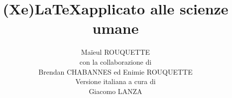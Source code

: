 







\title{(Xe)\LaTeX applicato alle scienze umane}
\author{Maïeul ROUQUETTE \\ con la collaborazione di \\ Brendan CHABANNES ed Enimie ROUQUETTE \\ Versione italiana a cura di \\ Giacomo LANZA}